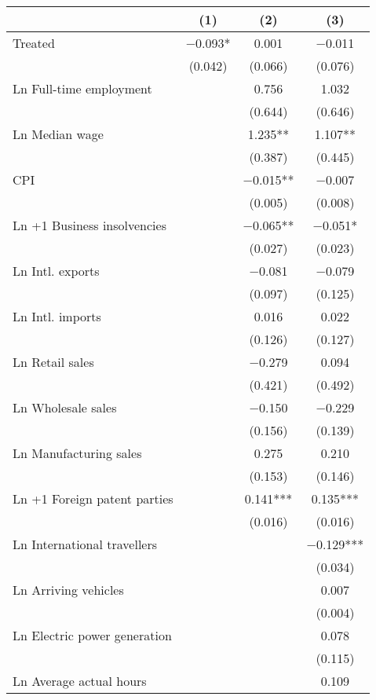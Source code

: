
\begin{tabular}[t]{lccc}
\toprule
  & (1) & (2) & (3)\\
\midrule
Treated & \num{-0.093}* & \num{0.001} & \num{-0.011}\\
 & (\num{0.042}) & (\num{0.066}) & (\num{0.076})\\
Ln Full-time employment &  & \num{0.756} & \num{1.032}\\
 &  & (\num{0.644}) & (\num{0.646})\\
Ln Median wage &  & \num{1.235}** & \num{1.107}**\\
 &  & (\num{0.387}) & (\num{0.445})\\
CPI &  & \num{-0.015}** & \num{-0.007}\\
 &  & (\num{0.005}) & (\num{0.008})\\
Ln +1 Business insolvencies &  & \num{-0.065}** & \num{-0.051}*\\
 &  & (\num{0.027}) & (\num{0.023})\\
Ln Intl. exports &  & \num{-0.081} & \num{-0.079}\\
 &  & (\num{0.097}) & (\num{0.125})\\
Ln Intl. imports &  & \num{0.016} & \num{0.022}\\
 &  & (\num{0.126}) & (\num{0.127})\\
Ln Retail sales &  & \num{-0.279} & \num{0.094}\\
 &  & (\num{0.421}) & (\num{0.492})\\
Ln Wholesale sales &  & \num{-0.150} & \num{-0.229}\\
 &  & (\num{0.156}) & (\num{0.139})\\
Ln Manufacturing sales &  & \num{0.275} & \num{0.210}\\
 &  & (\num{0.153}) & (\num{0.146})\\
Ln +1 Foreign patent parties &  & \num{0.141}*** & \num{0.135}***\\
 &  & (\num{0.016}) & (\num{0.016})\\
Ln International travellers &  &  & \num{-0.129}***\\
 &  &  & (\num{0.034})\\
Ln Arriving vehicles &  &  & \num{0.007}\\
 &  &  & (\num{0.004})\\
Ln Electric power generation &  &  & \num{0.078}\\
 &  &  & (\num{0.115})\\
Ln Average actual hours &  &  & \num{0.109}\\

\end{tabular}
